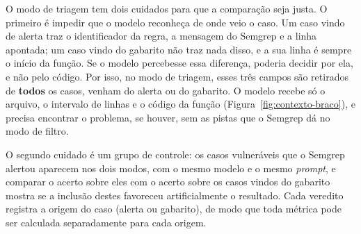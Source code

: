 O modo de triagem tem dois cuidados para que a comparação seja justa. O primeiro é impedir que o modelo reconheça de onde veio o caso. Um caso vindo de alerta traz o identificador da regra, a mensagem do Semgrep e a linha apontada; um caso vindo do gabarito não traz nada disso, e a sua linha é sempre o início da função. Se o modelo percebesse essa diferença, poderia decidir por ela, e não pelo código. Por isso, no modo de triagem, esses três campos são retirados de \textbf{todos} os casos, venham do alerta ou do gabarito. O modelo recebe só o arquivo, o intervalo de linhas e o código da função (Figura~\ref{fig:contexto-braco}), e precisa encontrar o problema, se houver, sem as pistas que o Semgrep dá no modo de filtro.

O segundo cuidado é um grupo de controle: os casos vulneráveis que o Semgrep alertou aparecem nos dois modos, com o mesmo modelo e o mesmo \textit{prompt}, e comparar o acerto sobre eles com o acerto sobre os casos vindos do gabarito mostra se a inclusão destes favoreceu artificialmente o resultado. Cada veredito registra a origem do caso (alerta ou gabarito), de modo que toda métrica pode ser calculada separadamente para cada origem.

